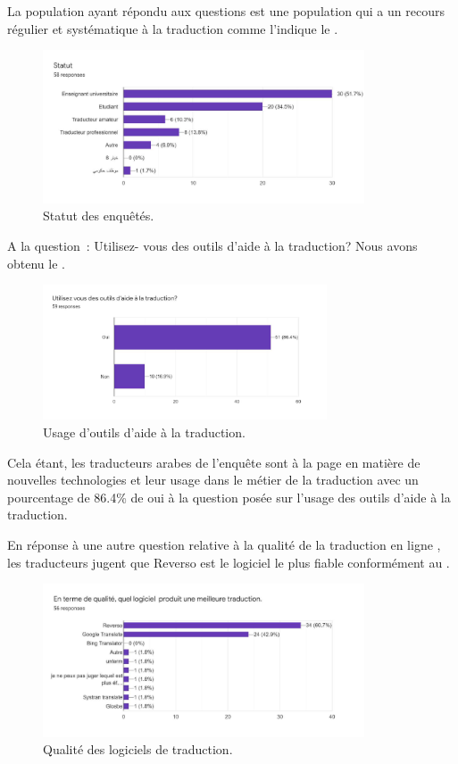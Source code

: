 \documentclass[french]{textolivre}
\begin{document}
La population ayant répondu aux questions est une population qui a un recours régulier et systématique à la traduction comme l’indique le .

\begin{figure}[htbp]
 \centering
 \includegraphics[width=0.85\textwidth]{figure02.pdf}
 \caption{Statut des enquêtés.}
 \label{fig-02}
\end{figure}

A la question : Utilisez- vous des outils d’aide à la traduction? Nous avons obtenu le .

\begin{figure}[htbp]
 \centering
 \includegraphics[width=0.75\textwidth]{figure03.pdf}
 \caption{Usage d’outils d’aide à la traduction.}
 \label{fig-03}
\end{figure}

Cela étant, les traducteurs arabes de l’enquête sont à la page en matière de nouvelles technologies et leur usage dans le métier de la traduction avec un pourcentage de 86.4\% de oui à la question posée sur l’usage des outils d’aide à la traduction.

En réponse à une autre question relative à la qualité de la traduction en ligne , les traducteurs jugent que Reverso est le logiciel le plus fiable conformément au . 

\begin{figure}[htbp]
 \centering
 \includegraphics[width=0.85\textwidth]{figure04.pdf}
 \caption{Qualité des logiciels de traduction.}
 \label{fig-04}
\end{figure}
\end{document}
